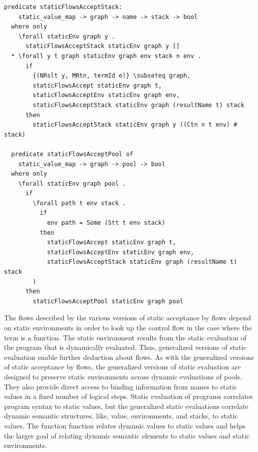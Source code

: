 \documentclass[letterpaper, 11pt]{extarticle}
\begin{document}
\begin{lstlisting}[language=logic, mathescape]
  predicate staticFlowsAcceptStack:
    static_value_map -> graph -> name -> stack -> bool
  where only
    \forall staticEnv graph y .
      staticFlowsAcceptStack staticEnv graph y []
  * \forall y t graph staticEnv graph env stack n env .
      if 
        {(NRslt y, MRtn, termId e)} \subseteq graph,
        staticFlowsAccept staticEnv graph t,
        staticFlowsAcceptEnv staticEnv graph env,
        staticFlowsAcceptStack staticEnv graph (resultName t) stack 
      then 
        staticFlowsAcceptStack staticEnv graph y ((Ctn n t env) # stack)

  predicate staticFlowsAcceptPool of
    static_value_map -> graph -> pool -> bool
  where only
    \forall staticEnv graph pool .
      if
        \forall path t env stack .
          if
            env path = Some (Stt t env stack)
          then 
            staticFlowsAccept staticEnv graph t, 
            staticFlowsAcceptEnv staticEnv graph env, 
            staticFlowsAcceptStack staticEnv graph (resultName t) stack
        ) 
      then
        staticFlowsAcceptPool staticEnv graph pool
\end{lstlisting}

The flows described by the various versions of static acceptance by flows depend on static
environments in order to look up the control flow in the case where the term is a function.
The static environment
results from the static evaluation of the program that is dynamically evaluated. Thus,
generalized
versions of static evaluation enable further deduction about flows.
As with the generalized versions of static acceptance by flows,
the generalized versions of static evaluation are designed to
preserve static environments across
dynamic evaluations of pools. They also provide direct access to binding information from names
to static values in a fixed number of logical steps. Static evaluation of programs correlates
program syntax to static values, but the generalized static evaluations correlate dynamic
semantic structures, like, value, environments, and stacks, to static values. The function
function relates dynamic values to static values and helps the larger goal of relating dynamic
semantic elements to static values and static environments.    
\end{document}
